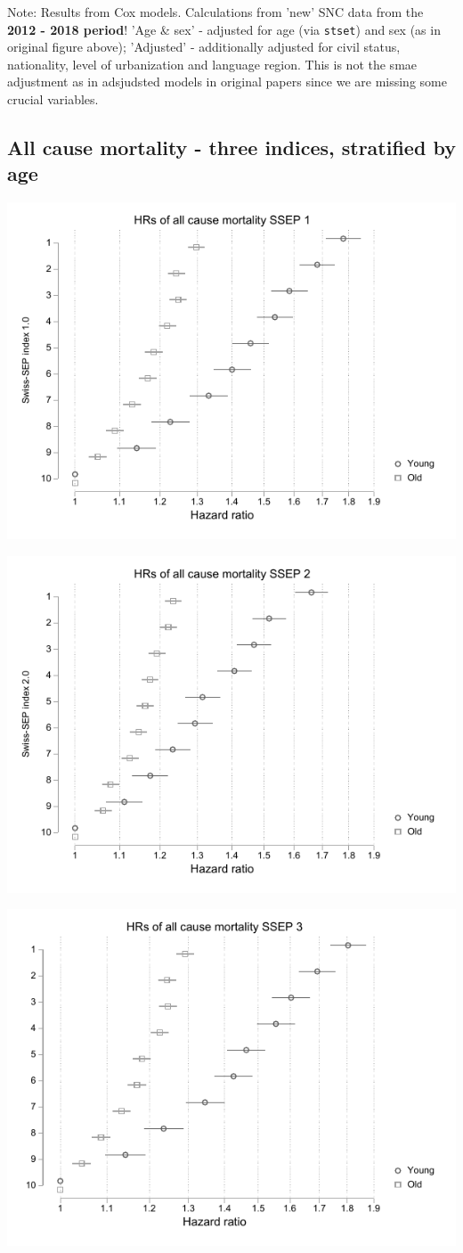 \documentclass[a4paper, notitlepage, fleqn]{article} %
\begin{document}
Note: 	Results from Cox models. Calculations from 'new' SNC data from the \textbf{2012 - 2018 period}!  
		'Age \& sex' - adjusted for age (via \texttt{stset}) and sex (as in original figure above);  
		'Adjusted' - additionally adjusted for civil status, nationality, level of urbanization and language region.  
		This is not the smae adjustment as in adsjudsted models in original papers since we are missing some crucial variables. 

\newpage
\subsection{All cause mortality - three indices, stratified by age}
\begin{center}
\includegraphics[width=.6\textwidth]{gr/strat_sep1.pdf}
\end{center}
\begin{center}
\includegraphics[width=.6\textwidth]{gr/strat_sep2.pdf}
\end{center}
\begin{center}
\includegraphics[width=.6\textwidth]{gr/strat_sep3.pdf}
\end{center}
\end{document}

